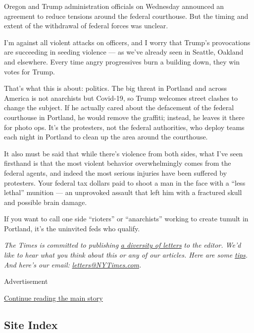 Oregon and Trump administration officials on Wednesday announced an
agreement to reduce tensions around the federal courthouse. But the
timing and extent of the withdrawal of federal forces was unclear.

I'm against all violent attacks on officers, and I worry that Trump's
provocations are succeeding in seeding violence --- as we've already
seen in Seattle, Oakland and elsewhere. Every time angry progressives
burn a building down, they win votes for Trump.

That's what this is about: politics. The big threat in Portland and
across America is not anarchists but Covid-19, so Trump welcomes street
clashes to change the subject. If he actually cared about the defacement
of the federal courthouse in Portland, he would remove the graffiti;
instead, he leaves it there for photo ops. It's the protesters, not the
federal authorities, who deploy teams each night in Portland to clean up
the area around the courthouse.

It also must be said that while there's violence from both sides, what
I've seen firsthand is that the most violent behavior overwhelmingly
comes from the federal agents, and indeed the most serious injuries have
been suffered by protesters. Your federal tax dollars paid to shoot a
man in the face with a ``less lethal'' munition --- an unprovoked
assault that left him with a fractured skull and possible brain damage.

If you want to call one side ``rioters'' or ``anarchists'' working to
create tumult in Portland, it's the uninvited feds who qualify.

\emph{The Times is committed to publishing}
\href{https://www.nytimes3xbfgragh.onion/2019/01/31/opinion/letters/letters-to-editor-new-york-times-women.html}{\emph{a
diversity of letters}} \emph{to the editor. We'd like to hear what you
think about this or any of our articles. Here are some}
\href{https://help.nytimes3xbfgragh.onion/hc/en-us/articles/115014925288-How-to-submit-a-letter-to-the-editor}{\emph{tips}}\emph{.
And here's our email:}
\href{mailto:letters@NYTimes.com}{\emph{letters@NYTimes.com}}\emph{.}

Advertisement

\protect\hyperlink{after-bottom}{Continue reading the main story}

\hypertarget{site-index}{%
\subsection{Site Index}\label{site-index}}

